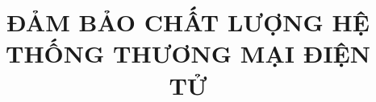 \documentclass[final]{thesis}
\title{ĐẢM BẢO CHẤT LƯỢNG HỆ THỐNG THƯƠNG MẠI ĐIỆN TỬ}
\begin{document}
\coverpage%

\frontmatter%





\begin{KeepFromToc}
\tableofcontents
\end{KeepFromToc}

\clearpage
\listoffigures

\clearpage
\listoftables

\mainmatter%













\nocite{*}
\end{document}
